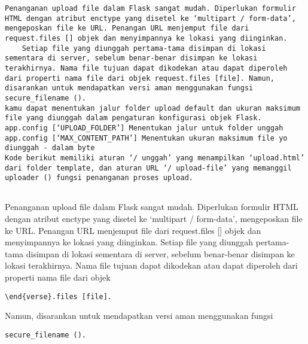\documentclass[12pt,a4paper]{article}
\begin{document}
\begin{verbatim}
Penanganan upload file dalam Flask sangat mudah. Diperlukan formulir HTML dengan atribut enctype yang disetel ke ‘multipart / form-data’, mengeposkan file ke URL. Penangan URL menjemput file dari request.files [] objek dan menyimpannya ke lokasi yang diinginkan.
	Setiap file yang diunggah pertama-tama disimpan di lokasi sementara di server, sebelum benar-benar disimpan ke lokasi terakhirnya. Nama file tujuan dapat dikodekan atau dapat diperoleh dari properti nama file dari objek request.files [file]. Namun, disarankan untuk mendapatkan versi aman menggunakan fungsi secure_filename ().
kamu dapat menentukan jalur folder upload default dan ukuran maksimum file yang diunggah dalam pengaturan konfigurasi objek Flask.
app.config [‘UPLOAD_FOLDER’] Menentukan jalur untuk folder unggah
app.config [‘MAX_CONTENT_PATH’] Menentukan ukuran maksimum file yo diunggah - dalam byte
Kode berikut memiliki aturan ‘/ unggah’ yang menampilkan ‘upload.html’ dari folder template, dan aturan URL ‘/ upload-file’ yang memanggil uploader () fungsi penanganan proses upload.


\end{verbatim}

Penanganan upload file dalam Flask sangat mudah. Diperlukan formulir HTML dengan atribut enctype yang disetel ke ‘multipart / form-data’, mengeposkan file ke URL. Penangan URL menjemput file dari request.files [] objek dan menyimpannya ke lokasi yang diinginkan. Setiap file yang diunggah pertama-tama disimpan di lokasi sementara di server, sebelum benar-benar disimpan ke lokasi terakhirnya. Nama file tujuan dapat dikodekan atau dapat diperoleh dari properti nama file dari objek 

\begin{verbatim}
\end{verse}.files [file]. 
\end{verbatim}
Namun, disarankan untuk mendapatkan versi aman menggunakan fungsi 


\begin{verbatim}
secure_filename ().
\end{verbatim}
\end{document}
